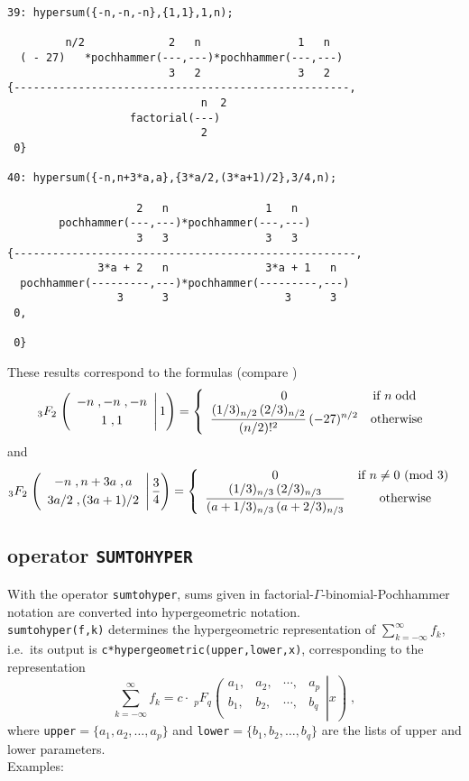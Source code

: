 {\small
\begin{verbatim}
39: hypersum({-n,-n,-n},{1,1},1,n);

         n/2             2   n               1   n
  ( - 27)   *pochhammer(---,---)*pochhammer(---,---)
                         3   2               3   2
{----------------------------------------------------,
                              n  2
                   factorial(---)
                              2
 0}

40: hypersum({-n,n+3*a,a},{3*a/2,(3*a+1)/2},3/4,n);

                    2   n               1   n
        pochhammer(---,---)*pochhammer(---,---)
                    3   3               3   3
{-----------------------------------------------------,
              3*a + 2   n               3*a + 1   n
  pochhammer(---------,---)*pochhammer(---------,---)
                 3      3                  3      3
 0,

 0}
\end{verbatim}
}\noindent
These results correspond to the formulas (compare \cite{Koepf:94b})
\[
_3 F_2\left.
\left(
\begin{array}{c}
-n\;, -n\;, -n\\[1mm]
1 \;, 1
\end{array}
\right| 1\right)
=
\left\{\begin{array}{cc} 0 & \text{if $n\;\mbox{odd}$ } \\ \displaystyle
\frac{(1/3)_{n/2}\,(2/3)_{n/2}}{(n/2)!^2}\,(-27)^{n/2}
 & \text{otherwise} \end{array}\right.
\]
and
\[
_3 F_2\left.
\left(
\begin{array}{c}
-n\;, n+3a\;, a\\[1mm]
3a/2\;,(3a+1)/2
\end{array}
\right| \frac{3}{4}\right)
=
\left\{\begin{array}{cc} 0 & \text{if $n\neq 0 {\mbox{ (mod }} 3)$ } \\ \displaystyle
\frac{(1/3)_{n/3}\,(2/3)_{n/3}}
{(a+1/3)_{n/3}\,(a+2/3)_{n/3}}
 & \text{otherwise} \end{array}\right.
\]

\subsection{\REDUCE{} operator \texttt{SUMTOHYPER}}
\hypertarget{operator:SUMTOHYPER}{}

With the operator \texttt{sumtohyper}, sums given in
factorial-$\Gamma$-binomial-Poch\-hammer notation
are converted into hypergeometric notation.\\
\texttt{sumtohyper(f,k)} determines the hypergeometric representation
of
$\sum\limits_{k=-\infty}^\infty f_k$,
i.e.\
its output is \texttt{c*hypergeometric(upper,lower,x)}, corresponding to
the representation
\[
\sum\limits_{k=-\infty}^\infty f_k=c\cdot\;
_{p}F_{q}\left.\left(\begin{array}{cccc}
a_{1},&a_{2},&\cdots,&a_{p}\\
b_{1},&b_{2},&\cdots,&b_{q}\\
            \end{array}\right| x\right)
\;,
\]
where \texttt{upper}$=\{a_{1}, a_{2}, \ldots, a_{p}\}$
and \texttt{lower}$=\{b_{1}, b_{2}, \ldots, b_{q}\}$
are the lists of upper and lower parameters.
\\
Examples:

